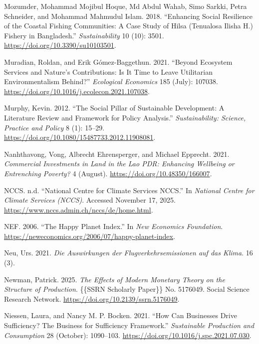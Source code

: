 \documentclass[
  a4paper,
  DIV=11,
  numbers=noendperiod,
  oneside,
  openany]{scrreprt}
\newlength{\cslhangindent}
\newenvironment{CSLReferences}[2] %
 {\begin{list}{}{%
  \setlength{\itemindent}{0pt}
  \setlength{\leftmargin}{0pt}
  \setlength{\parsep}{0pt}
  \ifodd #1
   \setlength{\leftmargin}{\cslhangindent}
   \setlength{\itemindent}{-1\cslhangindent}
  \fi
  \setlength{\itemsep}{#2\baselineskip}}}
 {\end{list}}
\begin{document}
\begin{CSLReferences}{1}{1}
Mozumder, Mohammad Mojibul Hoque, Md Abdul Wahab, Simo Sarkki, Petra
Schneider, and Mohammad Mahmudul Islam. 2018. {``Enhancing {Social
Resilience} of the {Coastal Fishing Communities}: {A Case Study} of
{Hilsa} ({Tenualosa Ilisha H}.) {Fishery} in {Bangladesh}.''}
\emph{Sustainability} 10 (10): 3501.
\url{https://doi.org/10.3390/su10103501}.

Muradian, Roldan, and Erik Gómez-Baggethun. 2021. {``Beyond Ecosystem
Services and Nature's Contributions: {Is} It Time to Leave Utilitarian
Environmentalism Behind?''} \emph{Ecological Economics} 185 (July):
107038. \url{https://doi.org/10.1016/j.ecolecon.2021.107038}.

Murphy, Kevin. 2012. {``The Social Pillar of Sustainable Development: A
Literature Review and Framework for Policy Analysis.''}
\emph{Sustainability: Science, Practice and Policy} 8 (1): 15--29.
\url{https://doi.org/10.1080/15487733.2012.11908081}.

Nanhthavong, Vong, Albrecht Ehrensperger, and Michael Epprecht. 2021.
\emph{Commercial Investments in Land in the {Lao PDR}: {Enhancing}
Wellbeing or Entrenching Poverty?} 4 (August).
\url{https://doi.org/10.48350/166007}.

NCCS. n.d. {``National {Centre} for {Climate} {Services} {NCCS}.''} In
\emph{National Centre for Climate Services (NCCS)}. Accessed November
17, 2025. \url{https://www.nccs.admin.ch/nccs/de/home.html}.

NEF. 2006. {``The {Happy} {Planet} {Index}.''} In \emph{New Economics
Foundation}. \url{https://neweconomics.org/2006/07/happy-planet-index}.

Neu, Urs. 2021. \emph{{Die Auswirkungen der Flugverkehrsemissionen auf
das Klima}}. 16 (3).

Newman, Patrick. 2025. \emph{The {Effects} of {Modern Monetary Theory}
on the {Structure} of {Production}}. \{\{SSRN Scholarly Paper\}\} No.
5176049. Social Science Research Network.
\url{https://doi.org/10.2139/ssrn.5176049}.

Niessen, Laura, and Nancy M. P. Bocken. 2021. {``How Can Businesses
Drive Sufficiency? {The} Business for Sufficiency Framework.''}
\emph{Sustainable Production and Consumption} 28 (October): 1090--103.
\url{https://doi.org/10.1016/j.spc.2021.07.030}.


\end{CSLReferences}
\end{document}
